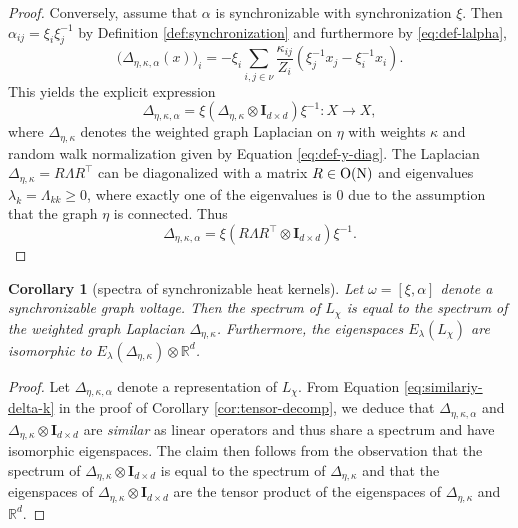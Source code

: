 \documentclass[10pt,reqno]{amsart}
\numberwithin{equation}{section}
\theoremstyle{bfnote}
\newtheorem{corollary}[theorem]{Corollary}
\theoremstyle{bfdef}
\newcommand{\R}{\mathbb{R}}
\newcommand{\II}{\mathbf{I}_{d \times d}}
\providecommand\x; %
\renewcommand{\x}{x}
\providecommand\gt; %
\renewcommand{\gt}{\xi}
\providecommand\a; %
\renewcommand{\a}{\alpha}
\providecommand\Lpl; %
\renewcommand{\Lpl}{\Delta}
\providecommand\hgen; %
\renewcommand{\hgen}{L}
\providecommand\vg; %
\renewcommand{\vg}{\chi}
\begin{document}
\begin{proof}
			Conversely, assume that $\a$ is synchronizable with synchronization $\gt$. Then $\a_{ij} = \gt_{i}\gt_{j}^{-1}$ by Definition \eqref{def:synchronization} and furthermore by \eqref{eq:def-lalpha},
			\begin{equation}
				\big(\Lpl_{\eta,\kappa,\a}(\x)\big)_i = - \gt_i \sum_{i,j \in \nu} \frac{\kappa_{ij}}{Z_i} ( \gt_j^{-1} \x_j - \gt_{i}^{-1} \x_i ).
			\end{equation}
			This yields the explicit expression
			\begin{equation}\label{eq:similariy-delta-k}
				\Lpl_{\eta,\kappa,\a} = \gt (\Delta_{\eta,\kappa} \otimes \II) \gt^{-1} :X \to X,
			\end{equation}
			where $\Delta_{\eta,\kappa}$ denotes the weighted graph Laplacian on $\eta$ with weights $\kappa$ and random walk normalization given by Equation \eqref{eq:def-y-diag}.
			The Laplacian $\Delta_{\eta,\kappa}=R\Lambda R^{\top}$ can be diagonalized with a matrix $R  \in \rm{O}(N)$ and eigenvalues $\lambda_{k}=\Lambda_{kk} \geq 0$, where exactly one of the eigenvalues is 0 due to the assumption that the graph $\eta$ is connected. Thus
			\begin{equation}
				\Lpl_{\eta,\kappa,\a} = \gt (R \Lambda R^\top \otimes \II) \gt^{-1}.
			\end{equation}
		\end{proof}

		\begin{corollary}[spectra of synchronizable heat kernels]
			Let $\omega = [\gt,\a]$ denote a synchronizable graph voltage.
			Then the spectrum of $\hgen_{\chi}$ is equal to the spectrum of the weighted graph Laplacian $\Delta_{\eta,\kappa}$. Furthermore, the eigenspaces $E_{\lambda}(\hgen_{\vg})$ are isomorphic to $E_{\lambda}(\Delta_{\eta,\kappa}) \otimes \R^{d}$.
		\end{corollary}
		\begin{proof}
			Let $\Delta_{\eta,\kappa,\alpha}$ denote a representation of $\hgen_{\chi}$. From  Equation \eqref{eq:similariy-delta-k} in the proof of Corollary \ref{cor:tensor-decomp}, we deduce that $\Delta_{\eta,\kappa,\alpha}$ and $\Delta_{\eta,\kappa} \otimes \II$ are \textit{similar} as linear operators and thus share a spectrum and have isomorphic eigenspaces. The claim then follows from the observation that the spectrum of $\Delta_{\eta,\kappa} \otimes \II$ is equal to the spectrum of $\Delta_{\eta,\kappa}$ and that the eigenspaces of $\Delta_{\eta,\kappa} \otimes \II$ are the tensor product of the eigenspaces of  $\Delta_{\eta,\kappa}$ and $\R^{d}$.
		\end{proof}
\end{document}
